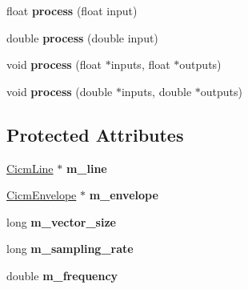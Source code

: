 \begin{DoxyCompactItemize}
\item 
\hypertarget{class_cicm_ring_modulation_aad65214bebc99186a72555eca8875a23}{float {\bfseries process} (float input)}\label{class_cicm_ring_modulation_aad65214bebc99186a72555eca8875a23}

\item 
\hypertarget{class_cicm_ring_modulation_af46c753c9e55989a42099f737d810340}{double {\bfseries process} (double input)}\label{class_cicm_ring_modulation_af46c753c9e55989a42099f737d810340}

\item 
\hypertarget{class_cicm_ring_modulation_aa7c8cbc4e28c9158689ef5c84846dcbb}{void {\bfseries process} (float $\ast$inputs, float $\ast$outputs)}\label{class_cicm_ring_modulation_aa7c8cbc4e28c9158689ef5c84846dcbb}

\item 
\hypertarget{class_cicm_ring_modulation_a7fe5d1310b4959648c788427c57e9d9a}{void {\bfseries process} (double $\ast$inputs, double $\ast$outputs)}\label{class_cicm_ring_modulation_a7fe5d1310b4959648c788427c57e9d9a}

\end{DoxyCompactItemize}
\subsection*{Protected Attributes}
\begin{DoxyCompactItemize}
\item 
\hypertarget{class_cicm_ring_modulation_a595019f0de136109a20b2f20b5995eff}{\hyperlink{class_cicm_line}{Cicm\-Line} $\ast$ {\bfseries m\-\_\-line}}\label{class_cicm_ring_modulation_a595019f0de136109a20b2f20b5995eff}

\item 
\hypertarget{class_cicm_ring_modulation_afb39ee82ab804e7f2b03aa3e796910a5}{\hyperlink{class_cicm_envelope}{Cicm\-Envelope} $\ast$ {\bfseries m\-\_\-envelope}}\label{class_cicm_ring_modulation_afb39ee82ab804e7f2b03aa3e796910a5}

\item 
\hypertarget{class_cicm_ring_modulation_a6434dc1562bd2f4bdcb76c946cca53a2}{long {\bfseries m\-\_\-vector\-\_\-size}}\label{class_cicm_ring_modulation_a6434dc1562bd2f4bdcb76c946cca53a2}

\item 
\hypertarget{class_cicm_ring_modulation_ac531f1e2606e838578610000834ecbab}{long {\bfseries m\-\_\-sampling\-\_\-rate}}\label{class_cicm_ring_modulation_ac531f1e2606e838578610000834ecbab}

\item 
\hypertarget{class_cicm_ring_modulation_ac430d37962411e406695f772f11985b8}{double {\bfseries m\-\_\-frequency}}\label{class_cicm_ring_modulation_ac430d37962411e406695f772f11985b8}

\end{DoxyCompactItemize}


